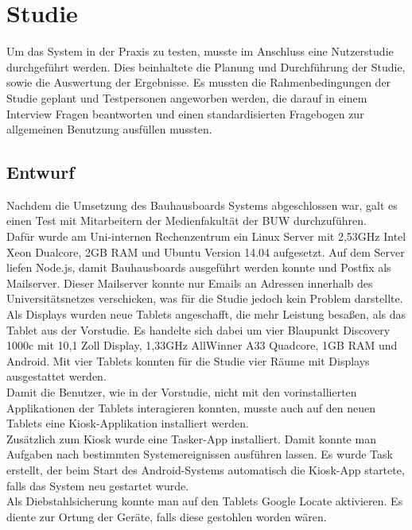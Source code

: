 \chapter{Studie}\label{Studie}
Um das System in der Praxis zu testen, musste im Anschluss eine Nutzerstudie durchgeführt werden.
Dies beinhaltete die Planung und Durchführung der Studie, sowie die Auswertung der Ergebnisse.
Es mussten die Rahmenbedingungen der Studie geplant und Testpersonen angeworben werden, die darauf in einem Interview Fragen beantworten und einen standardisierten Fragebogen zur allgemeinen Benutzung ausfüllen mussten.

\section{Entwurf}\label{Entwurf}
Nachdem die Umsetzung des Bauhausboards Systems abgeschlossen war, galt es einen Test mit Mitarbeitern der Medienfakultät der BUW durchzuführen.
\\
Dafür wurde am Uni-internen Rechenzentrum ein Linux Server mit 2,53GHz Intel Xeon Dualcore, 2GB RAM und Ubuntu Version 14.04 aufgesetzt.
Auf dem Server liefen Node.js, damit Bauhausboards ausgeführt werden konnte und Postfix als Mailserver.
Dieser Mailserver konnte nur Emails an Adressen innerhalb des Universitätsnetzes verschicken, was für die Studie jedoch kein Problem darstellte.
\\
Als Displays wurden neue Tablets angeschafft, die mehr Leistung besaßen, als das Tablet aus der Vorstudie.
Es handelte sich dabei um vier Blaupunkt Discovery 1000c mit 10,1 Zoll Display, 1,33GHz AllWinner A33 Quadcore, 1GB RAM und Android. Mit vier Tablets konnten für die Studie vier Räume mit Displays ausgestattet werden.
\\
Damit die Benutzer, wie in der Vorstudie, nicht mit den vorinstallierten Applikationen der Tablets interagieren konnten, musste auch auf den neuen Tablets eine Kiosk-Applikation installiert werden.
\\
Zusätzlich zum Kiosk wurde eine Tasker-App installiert.
Damit konnte man Aufgaben nach bestimmten Systemereignissen ausführen lassen.
Es wurde Task erstellt, der beim Start des Android-Systems automatisch die Kiosk-App startete, falls das System neu gestartet wurde.
\\
Als Diebstahlsicherung konnte man auf den Tablets Google Locate aktivieren.
Es diente zur Ortung der Geräte, falls diese gestohlen worden wären.
